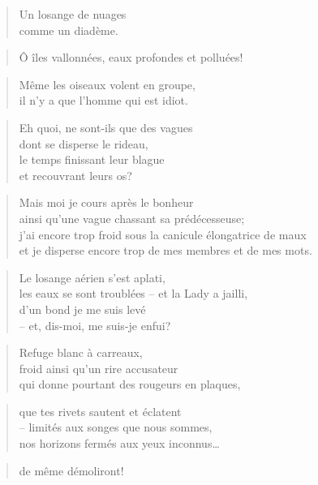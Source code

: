   \begin{verse}
    Un losange de nuages\\
    comme un diadème.
  \end{verse}
  \begin{verse}
    Ô îles vallonnées, eaux profondes et polluées!
  \end{verse}
  \begin{verse}
    Même les oiseaux volent en groupe,\\
    il n’y a que l’homme qui est idiot.
  \end{verse}
  \begin{verse}
    Eh quoi, ne sont-ils que des vagues\\
    dont se disperse le rideau,\\
    le temps finissant leur blague\\
    et recouvrant leurs os?
  \end{verse}
  \begin{verse}
    Mais moi je cours après le bonheur\\
    ainsi qu’une vague chassant sa prédécesseuse;\\
    j’ai encore trop froid sous la canicule élongatrice de maux\\
    et je disperse encore trop de mes membres et de mes mots.
  \end{verse}
  \begin{verse}
    Le losange aérien s’est aplati,\\
    les eaux se sont troublées -- et la Lady a jailli,\\
    d’un bond je me suis levé\\
    -- et, dis-moi, me suis-je enfui?
  \end{verse}
  \begin{verse}
    Refuge blanc à carreaux,\\
    froid ainsi qu’un rire accusateur\\
    qui donne pourtant des rougeurs en plaques,
  \end{verse}
  \begin{verse}
    que tes rivets sautent et éclatent\\
    -- limités aux songes que nous sommes,\\
    nos horizons fermés aux yeux inconnus… 
  \end{verse}
  \begin{verse}
    de même démoliront!
  \end{verse}
